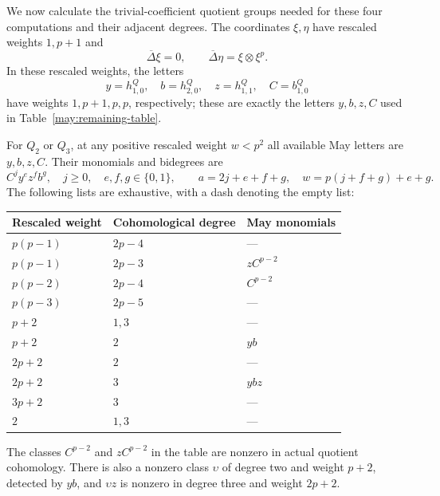 We now calculate the trivial-coefficient quotient groups needed for these
four computations and their adjacent degrees.
The coordinates $\xi,\eta$ have rescaled weights $1,p+1$ and
\begin{equation}\label{frob:quotient-coproduct}
 \overline\Delta\xi=0,\qquad
 \overline\Delta\eta=\xi\otimes\xi^p.
\end{equation}
In these rescaled weights, the letters
\[
 y=h_{1,0}^{Q},\quad b=h_{2,0}^{Q},\quad
 z=h_{1,1}^{Q},\quad C=b_{1,0}^{Q}
\]
have weights $1,p+1,p,p$, respectively; these are exactly the
letters $y,b,z,C$ used in Table~\ref{may:remaining-table}.

\begin{lemma}\label{frob:quotient-groups}
For $Q_2$ or $Q_3$, at any positive rescaled weight
$w<p^2$ all available May letters are $y,b,z,C$.
Their monomials and bidegrees are
\begin{equation}\label{frob:small-monomials}
 C^j y^e z^f b^g,\quad
 j\geq0,\quad e,f,g\in\{0,1\},\qquad
 a=2j+e+f+g,\quad w=p(j+f+g)+e+g.
\end{equation}
The following lists are exhaustive, with a dash denoting the empty
list:
\begin{center}
\begin{tabular}{lll}
\toprule
Rescaled weight & Cohomological degree & May monomials\\
\midrule
$p(p-1)$ & $2p-4$ & ---\\
$p(p-1)$ & $2p-3$ & $zC^{p-2}$\\
$p(p-2)$ & $2p-4$ & $C^{p-2}$\\
$p(p-3)$ & $2p-5$ & ---\\
$p+2$ & $1,3$ & ---\\
$p+2$ & $2$ & $yb$\\
$2p+2$ & $2$ & ---\\
$2p+2$ & $3$ & $ybz$\\
$3p+2$ & $3$ & ---\\
$2$ & $1,3$ & ---\\
\bottomrule
\end{tabular}
\end{center}
The classes $C^{p-2}$ and $zC^{p-2}$ in the table are nonzero in actual
quotient cohomology.  There is also a nonzero class $\upsilon$ of degree two
and weight $p+2$, detected by $yb$, and $\upsilon z$ is nonzero
in degree three and weight $2p+2$.
\end{lemma}

